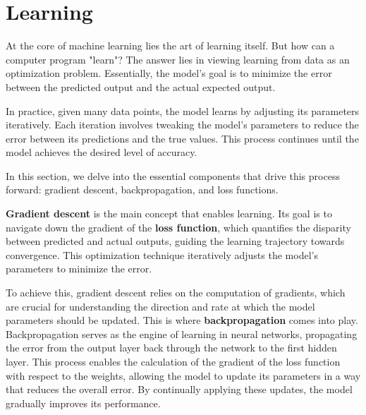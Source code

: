 \documentclass{article}
\begin{document}
\section{Learning}
  \label{sec:Learning}

  At the core of machine learning lies the art of learning itself. But how can a computer program "learn"? The answer lies in viewing learning from data as an optimization problem. Essentially, the model's goal is to minimize the error between the predicted output and the actual expected output.

 In practice, given many data points, the model learns by adjusting its parameters iteratively. Each iteration involves tweaking the model's parameters to reduce the error between its predictions and the true values. This process continues until the model achieves the desired level of accuracy.

In this section, we delve into the essential components that drive this process forward: gradient descent, backpropagation, and loss functions.

\textbf{Gradient descent} is the main concept that enables learning. Its goal is to navigate down the gradient of the \textbf{loss function}, which quantifies the disparity between predicted and actual outputs, guiding the learning trajectory towards convergence. This optimization technique iteratively adjusts the model’s parameters to minimize the error.

To achieve this, gradient descent relies on the computation of gradients, which are crucial for understanding the direction and rate at which the model parameters should be updated. This is where \textbf{backpropagation} comes into play. Backpropagation serves as the engine of learning in neural networks, propagating the error from the output layer back through the network to the first hidden layer. This process enables the calculation of the gradient of the loss function with respect to the weights, allowing the model to update its parameters in a way that reduces the overall error. By continually applying these updates, the model gradually improves its performance.
\end{document}
